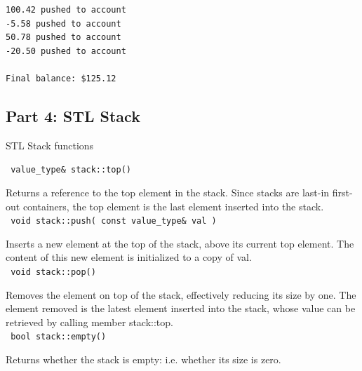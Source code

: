 \documentclass[a4paper,12pt]{book}
\begin{document}
\begin{lstlisting}[style=output]
100.42 pushed to account
-5.58 pushed to account
50.78 pushed to account
-20.50 pushed to account

Final balance: $125.12
\end{lstlisting}
                    
            
            \newpage
            \subsection*{Part 4: STL Stack}

                \begin{intro}{STL Stack functions}

                    \footnotesize
                    
                    \texttt{ value\_type\& stack::top() }

                        Returns a reference to the top element in the stack.
                        Since stacks are last-in first-out containers, the top
                        element is the last element inserted into the stack. \\
                    
                    \texttt{ void stack::push( const value\_type\& val ) }

                        Inserts a new element at the top of the stack,
                        above its current top element. The content of this
                        new element is initialized to a copy of val. \\

                    
                    \texttt{ void stack::pop() }

                        Removes the element on top of the stack, effectively reducing its size by one.
                        The element removed is the latest element inserted into the stack,
                        whose value can be retrieved by calling member stack::top. \\
                    
                    \texttt{ bool stack::empty() }

                        Returns whether the stack is empty: i.e. whether its size is zero. \\

                    
                \end{intro}
\end{document}
